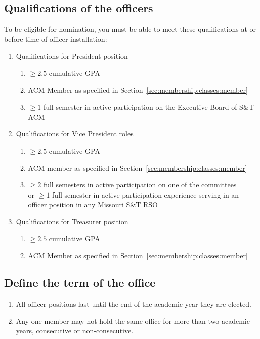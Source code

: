 \subsection{Qualifications of the officers}
To be eligible for nomination, you must be able to meet these qualifications at or before
time of officer installation:
\begin{enumerate}
  \item Qualifications for President position
    \begin{enumerate}
      \item $\geq{2.5}$ cumulative GPA
      \item ACM Member as specified in
        Section~\ref{sec:membership:classes:member}
      \item $\geq{1}$ full semester in active participation on the Executive
        Board of S\&T ACM
    \end{enumerate}
  \item Qualifications for Vice President roles
    \begin{enumerate}
      \item $\geq{2.5}$ cumulative GPA
      \item ACM member as specified in
        Section~\ref{sec:membership:classes:member}
      \item $\geq{2}$ full semesters in active participation on one of the
        committees\\ or $\geq{1}$ full semester in active participation
        experience serving in an officer position in any Missouri S\&T RSO
    \end{enumerate}
  \item Qualifications for Treasurer position
    \begin{enumerate}
      \item $\geq{2.5}$ cumulative GPA
      \item ACM Member as specified in
        Section~\ref{sec:membership:classes:member}
    \end{enumerate}
\end{enumerate}

\subsection{Define the term of the office}
\begin{enumerate}
  \item All officer positions last until the end of the academic year they are
    elected.
  \item Any one member may not hold the same office for more than two academic
    years, consecutive or non-consecutive.
\end{enumerate}

